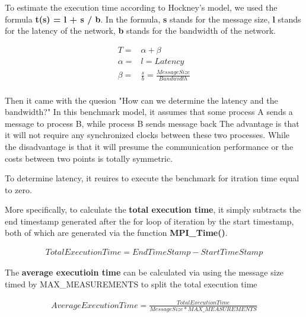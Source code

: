 
To estimate the execution time according to Hockney's model,
we used the formula \textbf{t(s) = l + s / b}. In the formula,
\textbf{s} stands for the message size,
\textbf{l} stands for the latency of the network,
\textbf{b} stands for the bandwidth of the network.

\begin{equation*}
    \begin{aligned}
    T = & \alpha + \beta \\
    \alpha = & l = Latency \\
    \beta = & \frac{s} {b} = \frac{Message Size} {Bandwidth}\\
    \end{aligned}
\end{equation*}

Then it came with the quesion "How can we determine the latency and the bandwidth?"
In this benchmark model, it assumes that some process A sends a message to process B, while process B sends message back
The advantage is that it will not require any synchronized clocks between these two processes.
While the disadvantage is that it will presume the communication performance or the costs between two points is totally symmetric.

To determine latency, it reuires to execute the benchmark for itration time equal to zero.

More specifically, to calculate the \textbf{total execution time},
it simply subtracts the end timestamp generated after the for loop of iteration
by the start timestamp, both of which are generated via the function \textbf{MPI\_Time()}.

\begin{equation*}
    \begin{aligned}
    TotalExecutionTime = EndTimeStamp - StartTimeStamp
    \end{aligned}
\end{equation*}

The \textbf{average executioin time} can be calculated via using the message size timed by MAX\_MEASUREMENTS to split the total execution time

\begin{equation*}
    \begin{aligned}
        AverageExecutionTime = \frac{TotalExecutionTime} {MessageSize * MAX\_MEASUREMENTS}
    \end{aligned}
\end{equation*}

